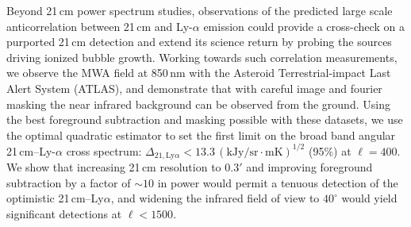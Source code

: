 Beyond 21\,cm power spectrum studies, observations of the predicted large scale anticorrelation between 21\,cm and Ly-$\alpha$ emission could provide a cross-check on a purported 21\,cm detection and extend its science return by probing the sources driving ionized bubble growth. Working towards such correlation measurements,  we observe the MWA field at 850\,nm with the Asteroid Terrestrial-impact Last Alert System (ATLAS),  and demonstrate that with careful image and fourier masking the near infrared background can be observed from the ground. Using the best foreground subtraction and masking possible with these datasets, we use the optimal quadratic estimator to set the first limit on the broad band angular 21\,cm--Ly-$\alpha$ cross spectrum: $\Delta_{21,\text{Ly}\alpha}<13.3\,(\text{kJy/sr}\cdot \text{mK})^{1/2}$ (95\%) at $\ell=400$. We show that increasing 21\,cm resolution to $0.3'$ and improving foreground subtraction by a factor of $\sim10$ in power would permit a tenuous detection of the optimistic 21\,cm--Ly$\alpha$, and widening the infrared field of view to $40^\circ$ would yield significant detections at $\ell<1500$. 
